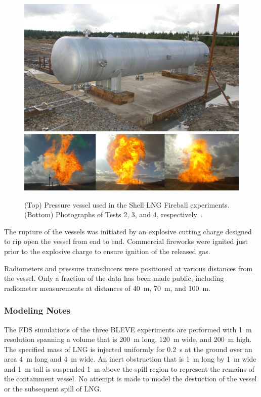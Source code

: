 \begin{figure}[!ht]
\includegraphics[width=\textwidth]{FIGURES/Shell_LNG_Fireballs/LNG_Tank}
\includegraphics[width=\textwidth]{FIGURES/Shell_LNG_Fireballs/Fireball_Images}
\caption[Photographs of the Shell LNG Fireball experiments]{(Top) Pressure vessel used in the Shell LNG Fireball experiments. (Bottom) Photographs of Tests 2, 3, and 4, respectively~\cite{Betteridge:2015}.}
\label{Shell_LNG_Fireball_Photos}
\end{figure}

The rupture of the vessels was initiated by an explosive cutting charge designed to rip open the vessel from end to end. Commercial fireworks were ignited just prior to the explosive charge to ensure ignition of the released gas.

Radiometers and pressure transducers were positioned at various distances from the vessel. Only a fraction of the data has been made public, including radiometer measurements at distances of 40~m, 70~m, and 100~m.

\subsubsection{Modeling Notes}

The FDS simulations of the three BLEVE experiments are performed with 1~m resolution spanning a volume that is 200~m long, 120~m wide, and 200~m high. The specified mass of LNG is injected uniformly for 0.2~s at the ground over an area 4~m long and 4~m wide. An inert obstruction that is 1~m long by 1~m wide and 1~m tall is suspended 1~m above the spill region to represent the remains of the containment vessel. No attempt is made to model the destuction of the vessel or the subsequent spill of LNG. 


